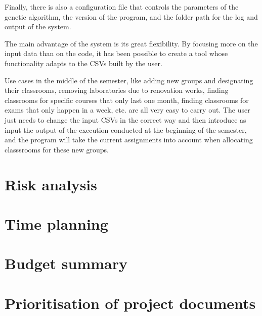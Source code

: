 Finally, there is also a configuration file that controls the parameters of the genetic algorithm, the version of the program, and the folder path for the log and output of the system.

The main advantage of the system is its great flexibility. By focusing more on the input data than on the code, it has been possible to create a tool whose functionality adapts to the CSVs built by the user.

Use cases in the middle of the semester, like adding new groups and designating their classrooms, removing laboratories due to renovation works, finding classrooms for specific courses that only last one month, finding classrooms for exams that only happen in a week, etc. are all very easy to carry out. The user just needs to change the input CSVs in the correct way and then introduce as input the output of the execution conducted at the beginning of the semester, and the program will take the current assignments into account when allocating classsrooms for these new groups.


\section{Risk analysis}
\section{Time planning}
\section{Budget summary}
\section{Prioritisation of project documents}

